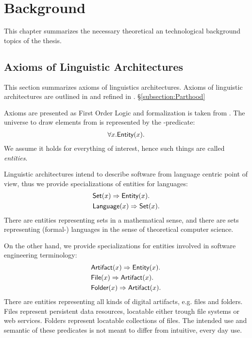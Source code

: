 \chapter{Background}
\label{chapter:Background}
This chapter summarizes the necessary theoretical an technological background topics of the thesis.

\section{Axioms of Linguistic Architectures}
\label{section:AxiomsOfLinguisticArchitectures}
This section summarizes axioms of linguistics architectures.
Axioms of linguistic architectures are outlined in \cite{DBLP:conf/sle/Lammel16} and refined in \cite{HeinzLV17}.
§\ref{subsection:Parthood} 

Axioms are presented as First Order Logic and formalization is taken from \cite{HeinzLV17}.
The universe to draw elements from is represented by the \Entity-predicate:
\begin{align*}
\forall x.\textsf{Entity}(x).
\end{align*}
We assume it holds for everything of interest, hence such things are called \textit{entities}.

Linguistic architectures intend to describe software from language centric point of view, thus we provide specializations of entities for languages:
\begin{align*}
&\textsf{Set}(x) \Rightarrow \textsf{Entity}(x).\\
&\textsf{Language}(x) \Rightarrow \textsf{Set}(x).
\end{align*}
There are entities representing sets in a mathematical sense, and there are sets representing (formal-) languages in the sense of theoretical computer science.

On the other hand, we provide specializations for entities involved in software engineering terminology:
\begin{align*}
&\textsf{Artifact}(x) \Rightarrow \textsf{Entity}(x).\\
&\textsf{File}(x) \Rightarrow \textsf{Artifact}(x).\\
&\textsf{Folder}(x) \Rightarrow \textsf{Artifact}(x).
\end{align*}
There are entities representing all kinds of digital artifacts, e.g. files and folders.
Files represent persistent data resources, locatable either trough file systems or web services.
Folders represent locatable collections of files.
The intended use and semantic of these predicates is not meant to differ from intuitive, every day use.


